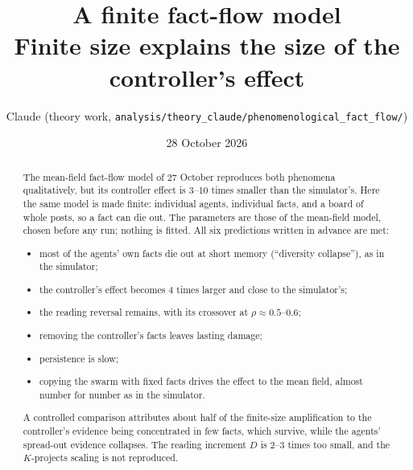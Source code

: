 \documentclass[10pt,a4paper]{article}
\title{\textbf{A finite fact-flow model}\\[2pt]
\textbf{Finite size explains the size of the controller's effect}}
\author{Claude (theory work, \nolinkurl{analysis/theory_claude/phenomenological_fact_flow/})}
\date{28 October 2026}
\begin{document}
\maketitle

\begin{abstract}
\noindent
The mean-field fact-flow model of 27 October reproduces both phenomena qualitatively, but its controller effect is 3--10
times smaller than the simulator's. Here the same model is made finite: individual agents, individual facts, and a board
of whole posts, so a fact can die out. The parameters are those of the mean-field model, chosen before any run; nothing
is fitted. All six predictions written in advance are met:
\begin{itemize}
\item most of the agents' own facts die out at short memory (``diversity collapse''), as in the simulator;
\item the controller's effect becomes 4 times larger and close to the simulator's;
\item the reading reversal remains, with its crossover at $\rho\approx0.5$--$0.6$;
\item removing the controller's facts leaves lasting damage;
\item persistence is slow;
\item copying the swarm with fixed facts drives the effect to the mean field, almost number for number as in the
  simulator.
\end{itemize}
A controlled comparison attributes about half of the finite-size amplification to the controller's evidence being
concentrated in few facts, which survive, while the agents' spread-out evidence collapses. The reading increment $D$ is
2--3 times too small, and the $K$-projects scaling is not reproduced.
\end{abstract}
\end{document}
